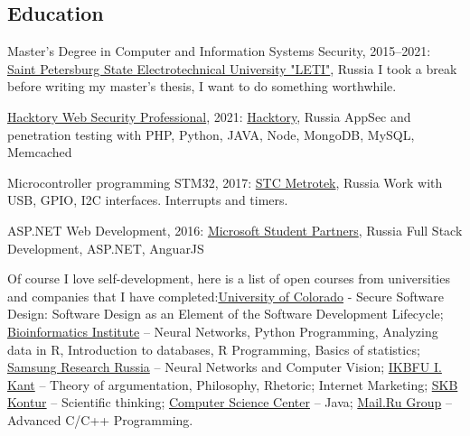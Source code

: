 \documentclass{yb}
\begin{document}
\subsection*{Education}

\begin{samepage}

Master's Degree in Computer and Information Systems Security, 2015--2021:\newline
\href{https://etu.ru/en/university/}{Saint Petersburg State Electrotechnical University "LETI"}, Russia\newline
I took a break before writing my master's thesis, I want to do something worthwhile.

\href{https://app.hacktory.ai/certificates/ca203296-188e-4df4-9308-4d4cb08e8b9f}{Hacktory Web Security Professional}, 2021:\newline
\href{https://hacktory.ai/}{Hacktory}, Russia\newline
AppSec and penetration testing with PHP, Python, JAVA, Node, MongoDB, MySQL, Memcached

Microcontroller programming STM32, 2017:\newline
\href{https://stc.metrotek.ru/}{STC Metrotek}, Russia\newline
Work with USB, GPIO, I2C interfaces. Interrupts and timers.

ASP.NET Web Development, 2016:\newline
\href{https://studentambassadors.microsoft.com/ru-ru}{Microsoft Student Partners}, Russia\newline
Full Stack Development, ASP.NET, AnguarJS\newline

Of course I love self-development, here is a list of open courses from universities and companies that I have completed:\newline \href{https://www.colorado.edu/}{University of Colorado} - Secure Software Design: Software Design as an Element of the Software Development Lifecycle; \href{https://bioinf.me/en}{Bioinformatics Institute} -- Neural Networks, Python Programming, Analyzing data in R, Introduction to databases, R Programming, Basics of statistics; \href{https://research.samsung.com/srr}{Samsung Research Russia} -- Neural Networks and Computer Vision; \href{https://eng.kantiana.ru/}{IKBFU I. Kant} -- Theory of argumentation, Philosophy, Rhetoric; Internet Marketing; \href{https://kontur.ru/}{SKB Kontur} -- Scientific thinking; \href{https://compscicenter.ru/}{Computer Science Center} -- Java; \href{https://en.wikipedia.org/wiki/VK_(company)}{Mail.Ru Group} -- Advanced C/C++ Programming.

\end{samepage}
\end{document}

